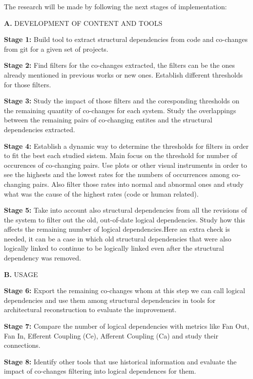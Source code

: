 \documentclass[12pt,a4paper,oneside]{report}
\begin{document}
The research will be made by following the next stages of implementation:


\textbf{A.} DEVELOPMENT OF CONTENT AND TOOLS

\textbf{Stage 1:} Build tool to extract structural dependencies from code and co-changes from git for a given set of projects.

\textbf{Stage 2:} Find filters for the co-changes extracted, the filters can be the ones already mentioned in previous works or new ones. Establish different thresholds for those filters.

\textbf{Stage 3:} Study the impact of those filters and the coresponding thresholds on the remaining quantity of co-changes for each system.
Study the overlappings between the remaining pairs of co-changing entites and the structural dependencies extracted. \cite{enase19}

\textbf{Stage 4:} Establish a dynamic way to determine the thresholds for filters in order to fit the best each studied sistem. Main focus on the threshold for number of occurences of co-changing pairs.
Use plots or other visual instruments in order to see the highests and the lowest rates for the numbers of occurrences among co-changing pairs.
Also filter those rates into normal and abnormal ones and study what was the cause of the highest rates (code or human related).

\textbf{Stage 5:} Take into account also structural dependencies from all the revisions of the system to filter out the old, out-of-date logical dependencies. 
Study how this affects the remaining number of logical dependencies.Here an extra check is needed, it can be a case in which old structural dependencies that were also logically linked to continue to be logically linked
even after the structural dependency was removed.

\textbf{B.} USAGE

\textbf{Stage 6:} Export the remaining co-changes whom at this step we can call logical dependencies and use them among structural dependencies in tools for architectural reconstruction to evaluate the improvement.

\textbf{Stage 7:} Compare the number of logical dependencies with metrics like Fan Out, Fan In, Efferent Coupling (Ce), Afferent Coupling (Ca) and study their connections.

\textbf{Stage 8:} Identify other tools that use historical information and evaluate the impact of co-changes filtering into logical dependences for them. 
\end{document}
